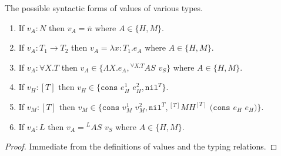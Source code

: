 \begin{lemma}
\label{cf}
\onehalfspacing
The possible syntactic forms of values of various types.
\begin{enumerate}
\item If $v_{A}:N$ then $v_{A}=\overline{n}$ where $A\in\lbrace H,M\rbrace$.
\item If $v_{A}:T_{1}\rightarrow T_{2}$ then $v_{A}=\lambda x:T_{1}.e_{A}$ where $A\in\lbrace H,M\rbrace$.
\item If $v_{A}:\forall X.T$ then $v_{A}\in\lbrace\Lambda X.e_{A},{^{\forall X.T}A}S$ $v_{S}\rbrace$ where $A\in\lbrace H,M\rbrace$.
\item If $v_{H}:[T]$ then $v_{H}\in\lbrace\mathtt{cons}$ $e_{H}^{1}$ $e_{H}^{2},\mathtt{nil}^{T}\rbrace$.
\item If $v_{M}:[T]$ then $v_{M}\in\lbrace\mathtt{cons}$ $v_{M}^{1}$ $v_{M}^{2},\mathtt{nil}^{T},{^{[T]}M}H^{[T]}$ $(\mathtt{cons}$ $e_{H}$ $e_{H})\rbrace$.
\item If $v_{A}:L$ then $v_{A}={^{L}A}S$ $v_{S}$ where $A\in\lbrace H,M\rbrace$.
\end{enumerate}
\begin{proof}
Immediate from the definitions of values and the typing relations.
\end{proof}
\end{lemma}